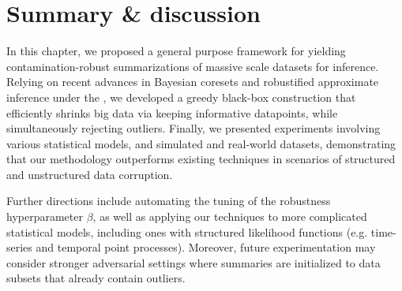 \section{Summary \& discussion}%
\label{sec:conclusion}
In this chapter, we proposed a general purpose framework for yielding  contamination-robust summarizations of massive scale datasets for inference. Relying on recent advances in Bayesian coresets and robustified approximate inference under the \bdiv{}, we developed a greedy black-box construction that efficiently shrinks big data via keeping informative datapoints, while simultaneously rejecting outliers.
 Finally, we presented experiments involving various statistical models, and simulated and real-world datasets, demonstrating that our methodology outperforms existing techniques in scenarios of structured and unstructured data corruption. 

Further directions include automating the tuning of the robustness hyperparameter $\beta$, as well as applying our techniques to more complicated statistical models, including ones with structured likelihood functions (e.g. time-series and temporal point processes). Moreover, future experimentation may consider stronger adversarial settings where summaries are initialized to data subsets that already contain outliers. 